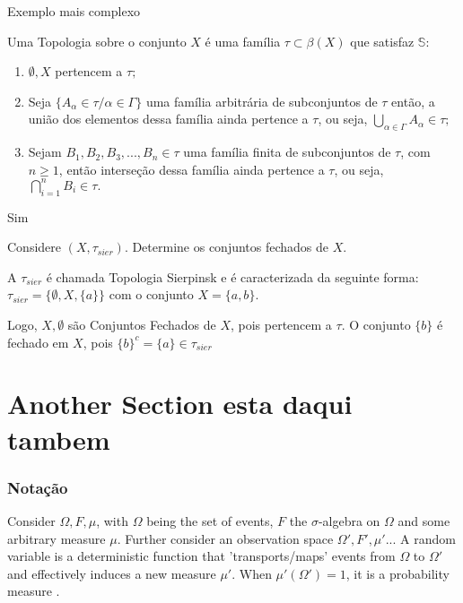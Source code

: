 \documentclass[aspectratio=169]{beamer}
\begin{document}
\begin{frame}{Exemplo mais complexo}
\begin{defi}
Uma Topologia sobre o conjunto $X$ é uma família $\tau
\subset \beta(X)$ que satisfaz $ \mathbb{S} $:
\begin{enumerate}[i]
 \item $\emptyset,X$ pertencem a $\tau;$
 \item Seja  $\{A_{\alpha} \in \tau /\alpha \in \Gamma\}$
 uma família arbitrária de subconjuntos de  $\tau$ então, a união dos elementos dessa família ainda pertence a  $\tau$, ou seja, $\bigcup \limits_{\alpha \in \Gamma} A_{\alpha}\in\tau;$
 \item Sejam $B_{1},B_{2},B_{3},..., B_{n} \in \tau$ uma família finita de subconjuntos de $\tau$, com $n \geq 1$, então
 interseção dessa família ainda pertence a $\tau$, ou seja, $\bigcap\limits_{i=1}^{n} B_{i}\in \tau.$
\end{enumerate}
\end{defi}
   
\end{frame}




\begin{frame}{Sim}
\begin{ex}
Considere $(X, \tau_{sier})$. Determine os conjuntos
fechados de $X$.

A $\tau_{sier}$ é chamada Topologia Sierpinsk e é caracterizada da
seguinte forma: $\tau_{sier} = \{\emptyset, X ,\{a\}\}$ com o conjunto $X = \{a,b\}$.

Logo, $X, \emptyset$ são Conjuntos Fechados de $X$, pois pertencem a
$\tau$. O conjunto $\{b\}$ é fechado em $X$, pois $\{b\}^{c} = \{a\}
\in \tau_{sier}$
\end{ex}
\end{frame}








\section{Another Section esta daqui tambem} %
\label{sec:another_section}

\begin{frame}
	\frametitle{Notação}
	\begin{defi}
		Consider $\Omega, F, \mu$, with $\Omega$ being the set of events, $F$ the $\sigma$-algebra on $\Omega$ and some arbitrary measure $\mu$. Further consider an observation space $\Omega', F', \mu'$... A random variable is a deterministic function that 'transports/maps' events from $\Omega$ to $\Omega'$ and effectively induces a new measure $\mu'$. When $\mu'(\Omega') = 1$, it is a probability measure \cite{nakayama:98}.

	\end{defi}
	
\end{frame}
\end{document}
